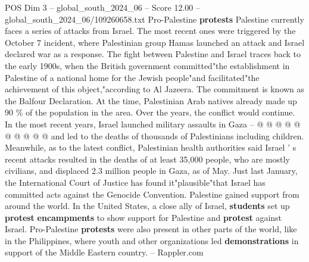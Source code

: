 \begin{textsample}{POS Dim 3 – global\_south\_2024\_06 – Score 12.00 – global\_south\_2024\_06/109260658.txt}
Pro-Palestine \textbf{protests} Palestine currently faces a series of attacks from Israel.
The most recent ones were triggered by the October 7 incident, where Palestinian group Hamas launched an attack and Israel declared war as a response.
The fight between Palestine and Israel traces back to the early 1900s, when the British government committed"the establishment in Palestine of a national home for the Jewish people"and facilitated"the achievement of this object,"according to Al Jazeera.
The commitment is known as the Balfour Declaration.
At the time, Palestinian Arab natives already made up 90 \% of the population in the area.
Over the years, the conflict would continue.
In the most recent years, Israel launched military assaults in Gaza -- @ @ @ @ @ @ @ @ @ @ and led to the deaths of thousands of Palestinians including children.
Meanwhile, as to the latest conflict, Palestinian health authorities said Israel ' s recent attacks resulted in the deaths of at least 35,000 people, who are mostly civilians, and displaced 2.3 million people in Gaza, as of May.
Just last January, the International Court of Justice has found it"plausible"that Israel has committed acts against the Genocide Convention.
Palestine gained support from around the world.
In the United States, a close ally of Israel, \textbf{students} set up \textbf{protest} \textbf{encampments} to show support for Palestine and \textbf{protest} against Israel.
Pro-Palestine \textbf{protests} were also present in other parts of the world, like in the Philippines, where youth and other organizations led \textbf{demonstrations} in support of the Middle Eastern country. -- Rappler.com

\end{textsample}
